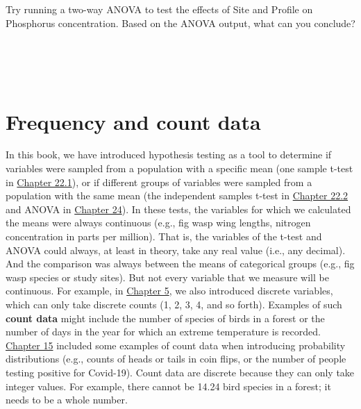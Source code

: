 \documentclass[
  openany]{krantz}
\begin{document}
\begin{verbatim}





\end{verbatim}

Try running a two-way ANOVA to test the effects of Site and Profile on Phosphorus concentration.
Based on the ANOVA output, what can you conclude?

\begin{verbatim}




\end{verbatim}

\hypertarget{Chapter_29}{%
\chapter{Frequency and count data}\label{Chapter_29}}

In this book, we have introduced hypothesis testing as a tool to determine if variables were sampled from a population with a specific mean (one sample t-test in \protect\hyperlink{one-sample-t-test}{Chapter 22.1}), or if different groups of variables were sampled from a population with the same mean (the independent samples t-test in \protect\hyperlink{independent-samples-t-test}{Chapter 22.2} and ANOVA in \protect\hyperlink{Chapter_24}{Chapter 24}).
In these tests, the variables for which we calculated the means were always continuous (e.g., fig wasp wing lengths, nitrogen concentration in parts per million).
That is, the variables of the t-test and ANOVA could always, at least in theory, take any real value (i.e., any decimal).
And the comparison was always between the means of categorical groups (e.g., fig wasp species or study sites).
But not every variable that we measure will be continuous.
For example, in \protect\hyperlink{Chapter_5}{Chapter 5}, we also introduced discrete variables, which can only take discrete counts (1, 2, 3, 4, and so forth).
Examples of such \textbf{count data} might include the number of species of birds in a forest or the number of days in the year for which an extreme temperature is recorded.
\protect\hyperlink{Chapter_15}{Chapter 15} included some examples of count data when introducing probability distributions (e.g., counts of heads or tails in coin flips, or the number of people testing positive for Covid-19).
Count data are discrete because they can only take integer values.
For example, there cannot be 14.24 bird species in a forest; it needs to be a whole number.
\end{document}
